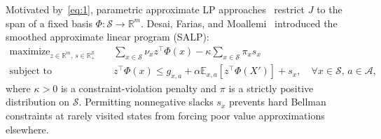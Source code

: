\documentclass[11pt,letterpaper]{article}
\newcommand{\E}{\mathbb{E}}
\newcommand{\R}{\mathbb{R}}
\theoremstyle{definition}
\begin{document}
Motivated by~\eqref{eq:1}, parametric approximate LP approaches~\cite{SchweitzerSeidman85,deFariasVanRoy03} restrict $J$ to the span of a fixed basis $\Phi:\mathcal{S}\to\R^m$. Desai, Farias, and Moallemi~\cite{DesaiFariasMoallemi12} introduced the smoothed approximate linear program (SALP):
\begin{equation}
\begin{aligned}
 \text{maximize}_{z\in\R^m,\, s\in\R_+^{\mathcal{S}}}\quad & \sum_{x\in\mathcal{S}} \nu_x z^\top \Phi(x) - \kappa \sum_{x\in\mathcal{S}} \pi_x s_x \\
 \text{subject to}\quad & z^\top \Phi(x) \le g_{x,a} + \alpha \E_{x,a}[z^\top \Phi(X')] + s_x, \quad \forall x\in\mathcal{S},\, a\in\mathcal{A},
\end{aligned}
\tag{2}\label{eq:2}
\end{equation}
where $\kappa > 0$ is a constraint-violation penalty and $\pi$ is a strictly positive distribution on $\mathcal{S}$. Permitting nonnegative slacks $s_x$ prevents hard Bellman constraints at rarely visited states from forcing poor value approximations elsewhere.
\end{document}
